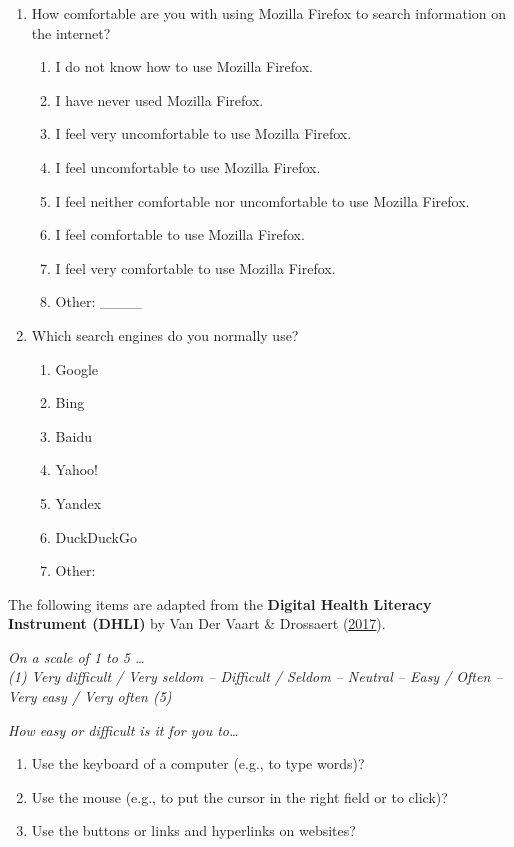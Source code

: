 \documentclass[letterpaper, nobind]{templates/ociamthesis}
\providecommand{\tightlist}{%
  \setlength{\itemsep}{0pt}\setlength{\parskip}{0pt}}
\begin{document}
\begin{enumerate}
\def\labelenumi{\arabic{enumi}.}
\setcounter{enumi}{1}
\item
  How comfortable are you with using Mozilla Firefox to search information on the internet?

  \begin{enumerate}
  \def\labelenumii{\arabic{enumii}.}
  \tightlist
  \item
    I do not know how to use Mozilla Firefox.
  \item
    I have never used Mozilla Firefox.
  \item
    I feel very uncomfortable to use Mozilla Firefox.
  \item
    I feel uncomfortable to use Mozilla Firefox.
  \item
    I feel neither comfortable nor uncomfortable to use Mozilla Firefox.
  \item
    I feel comfortable to use Mozilla Firefox.
  \item
    I feel very comfortable to use Mozilla Firefox.
  \item
    Other: \_\_\_\_
  \end{enumerate}
\item
  Which search engines do you normally use?

  \begin{enumerate}
  \def\labelenumii{\arabic{enumii}.}
  \tightlist
  \item
    Google
  \item
    Bing
  \item
    Baidu
  \item
    Yahoo!
  \item
    Yandex
  \item
    DuckDuckGo
  \item
    Other:
  \end{enumerate}
\end{enumerate}

The following items are adapted from the \textbf{Digital Health Literacy Instrument (DHLI)} by Van Der Vaart \& Drossaert (\protect\hyperlink{ref-van2017development}{2017}).

\emph{On a scale of 1 to 5 \ldots{}\\
(1) Very difficult / Very seldom -- Difficult / Seldom -- Neutral -- Easy / Often -- Very easy / Very often (5)}

\emph{How easy or difficult is it for you to\ldots{}}

\begin{enumerate}
\def\labelenumi{\arabic{enumi}.}
\setcounter{enumi}{3}
\tightlist
\item
  Use the keyboard of a computer (e.g., to type words)?
\item
  Use the mouse (e.g., to put the cursor in the right field or to click)?
\item
  Use the buttons or links and hyperlinks on websites?
\end{enumerate}
\end{document}
